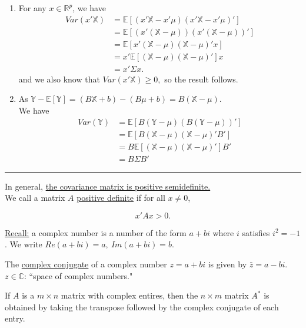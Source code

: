 \documentclass[twoside]{article}
\newcommand*\mean[1]{\bar{#1}}
\newenvironment{proof}{{\bf Proof:}}{\hfill\rule{2mm}{2mm}}
\begin{document}
\begin{proof}
	\begin{enumerate}
		\item For any $x\in\mathbb{R}^p$, we have
			\begin{equation}
				\begin{split}
					Var(x'\mathbb{X})&=\mathbb{E}[(x'\mathbb{X}-x'\mu)(x'\mathbb{X}-x'\mu)']\\
					&=\mathbb{E}[(x'(\mathbb{X}-\mu))(x'(\mathbb{X}-\mu))']\\
					&=\mathbb{E}[x'(\mathbb{X}-\mu)(\mathbb{X}-\mu)'x]\\
					&=x'\mathbb{E}[(\mathbb{X}-\mu)(\mathbb{X}-\mu)']x\\
					&=x'\Sigma x.
				\end{split}
			\end{equation} and we also know that $Var(x'\mathbb{X})\geq 0,$ so the result follows.
		\item As $\mathbb{Y}-\mathbb{E[Y]}=(B\mathbb{X}+b)-(B\mu+b)=B(\mathbb{X}-\mu).$\\
			We have
			\begin{equation}
				\begin{split}
					Var(\mathbb{Y})&=\mathbb{E}[B(\mathbb{Y}-\mu)(B(\mathbb{Y}-\mu))']\\
					&=\mathbb{E}[B(\mathbb{X}-\mu)(\mathbb{X}-\mu)'B']\\
					&=B\mathbb{E}[(\mathbb{X}-\mu)(\mathbb{X}-\mu)']B'\\
					&=B\Sigma B'
				\end{split}
			\end{equation}
	\end{enumerate}
\end{proof}

In general, \underline{the covariance matrix is positive semidefinite.}\\

We call a matrix $A$ \underline{positive definite} if for all $x\not=0$,

$$x'Ax > 0.$$

\underline{Recall:} a complex number is a number of the form $a+bi$ where $i$ satisfies $i^2=-1$. We write $Re(a+bi)=a,\ Im(a+bi)=b$.

The \underline{complex conjugate} of a complex number $z=a+bi$ is given by $\mean{z}=a-bi$. $z\in\mathbb{C}$: ``space of complex numbers."

If $A$ is a $m\times n$ matrix with complex entires, then the $n\times m$ matrix $A^*$ is obtained by taking the transpose followed by the complex conjugate of each entry.
\end{document}
